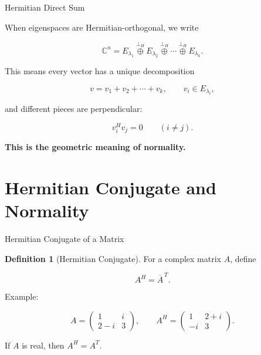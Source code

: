 \documentclass[10pt]{beamer}
\theoremstyle{definition}
\newtheorem{defi}{Definition}[section]
\newcommand{\x}[1]{\alert{\textbf{#1}}}
\newcommand{\orthoplusH}{\mathbin{\overset{\perp_H}{\oplus}}}
\begin{document}
\begin{frame}{Hermitian Direct Sum}

When eigenspaces are Hermitian-orthogonal, we write

$$
\mathbb C^n
=E_{\lambda_1}\orthoplusH E_{\lambda_2}\orthoplusH\cdots\orthoplusH E_{\lambda_k}.
$$

\vfill

This means every vector has a unique decomposition

$$
v=v_1+v_2+\cdots+v_k,
\qquad v_i\in E_{\lambda_i},
$$

and different pieces are perpendicular:

$$
v_i^Hv_j=0\qquad (i\ne j).
$$

\vfill

\begin{center}
\x{This is the geometric meaning of normality.}
\end{center}

\end{frame}

\section{Hermitian Conjugate and Normality}

\begin{frame}{Hermitian Conjugate of a Matrix}

\begin{defi}[Hermitian Conjugate]
For a complex matrix $A$, define

$$
A^H=\overline{A}^{\,T}.
$$
\end{defi}

\vfill

Example:

$$
A=\begin{pmatrix}1&i\\2-i&3\end{pmatrix},
\qquad
A^H=\begin{pmatrix}1&2+i\\-i&3\end{pmatrix}.
$$

\vfill

If $A$ is real, then $A^H=A^T$.

\end{frame}
\end{document}
